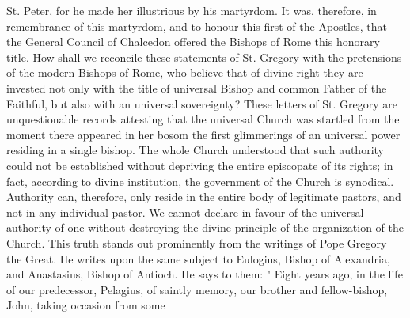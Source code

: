 St. Peter, for he made her illustrious by his martyrdom. It was, therefore, in remembrance of this martyrdom, and to honour this first of the Apostles, that the General Council of Chalcedon offered the Bishops of Rome this honorary title. How shall we reconcile these statements of St. Gregory with the pretensions of the modern Bishops of Rome, who believe that of divine right they are invested not only with the title of universal Bishop and common Father of the Faithful, but also with an universal sovereignty? These letters of St. Gregory are unquestionable records attesting that the universal Church was startled from the moment there appeared in her bosom the first glimmerings of an universal power residing in a single bishop. The whole Church understood that such authority could not be established without depriving the entire episcopate of its rights; in fact, according to divine institution, the government of the Church is synodical. Authority can, therefore, only reside in the entire body of legitimate pastors, and not in any individual pastor. We cannot declare in favour of the universal authority of one without destroying the divine principle of the organization of the Church. This truth stands out prominently from the writings of Pope Gregory the Great. He writes upon the same subject to Eulogius, Bishop of Alexandria, and Anastasius, Bishop of Antioch. He says to them: " Eight years ago, in the life of our predecessor, Pelagius, of saintly memory, our brother and fellow-bishop, John, taking occasion from some

